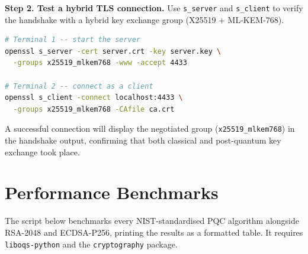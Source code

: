\noindent\textbf{Step 2. Test a hybrid TLS connection.}
Use \texttt{s\_server} and \texttt{s\_client} to verify the handshake
with a hybrid key exchange group (X25519 + ML-KEM-768).

\begin{lstlisting}[language=bash,caption={Hybrid TLS 1.3 handshake test}]
# Terminal 1 -- start the server
openssl s_server -cert server.crt -key server.key \
  -groups x25519_mlkem768 -www -accept 4433

# Terminal 2 -- connect as a client
openssl s_client -connect localhost:4433 \
  -groups x25519_mlkem768 -CAfile ca.crt
\end{lstlisting}

\noindent A successful connection will display the negotiated group
(\texttt{x25519\_mlkem768}) in the handshake output, confirming that
both classical and post-quantum key exchange took place.

\section{Performance Benchmarks}
\label{app:benchmarks}

The script below benchmarks every NIST-standardised PQC algorithm alongside
RSA-2048 and ECDSA-P256, printing the results as a formatted table. It
requires \texttt{liboqs-python} and the \texttt{cryptography} package.

